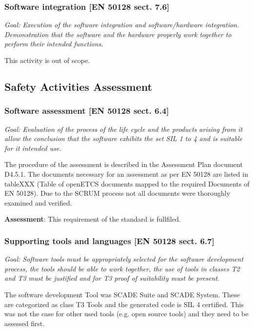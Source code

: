 \subsubsection{Software integration [EN 50128 sect. 7.6]}
\textit{Goal: Execution of the software integration and software/hardware integration. Demonstration that the software and the hardware properly work together to perform their intended functions.}

\bigskip

This activity is out of scope.

\bigskip

\subsection{Safety Activities Assessment}

\bigskip

\subsubsection{Software assessment [EN 50128 sect. 6.4]}
\textit{Goal: Evaluation of the process of the life cycle and the products arising from it allow the conclusion that the software exhibits the set SIL 1 to 4 and is suitable for it intended use.}

\bigskip
{}
The procedure of the assessment is described in the Assessment Plan document D4.5.1. The documents necessary for an assessment as per EN 50128 are listed in tableXXX (Table of openETCS documents mapped to the required Documents of EN 50128). Due to the SCRUM process not all documents were thoroughly examined and verified.

\bigskip

\textbf{Assessment}:
\bigskip
This requirement of the standard is fullfiled.
\bigskip

\subsubsection{Supporting tools and languages [EN 50128 sect. 6.7]}
\textit{Goal: Software tools must be appropriately selected for the software development process, the tools should be able to work together, the use of tools in classes T2 and T3 must be justified and for T3 proof of suitability must be present.}

\bigskip
The software development Tool was SCADE Suite and SCADE System. These are categorized as class T3 Tools and the generated code is SIL 4 certified. This was not the case for other used tools (e.g. open source tools) and they need to be assessed first.

